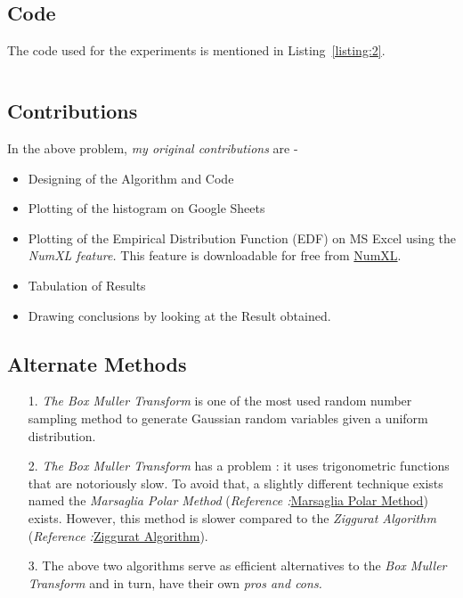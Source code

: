 \documentclass[titlepage, 11pt]{article}
\begin{document}
\newpage
\subsection{Code}
The code used for the experiments is mentioned in Listing~\ref{listing:2}. 

\inputminted[breaklines,
 mathescape,
 linenos,
 numbersep=5pt,
 frame=single,
 numbersep=5pt,
 xleftmargin=0pt]{c}{A2P2.c}
\label{listing:2}


\subsection{Contributions}
In the above problem, \textit{my original contributions} are - 
\begin{itemize}
    \item Designing of the Algorithm and Code
    \item Plotting of the histogram on Google Sheets 
    \item Plotting of the Empirical Distribution Function (EDF) on MS Excel using the \emph{NumXL feature.} This feature is downloadable for free from \href{https://numxl.com/}{NumXL}.
    \item Tabulation of Results 
    \item Drawing conclusions by looking at the Result obtained.
\end{itemize}

\subsection{Alternate Methods}
\begin{itemize}
    \item [1.]\textit{The Box Muller Transform} is one of the most used random number sampling method to generate Gaussian random variables given a uniform distribution. 
    \item [2.] \textit{The Box Muller Transform} has a problem : it uses trigonometric functions that are notoriously slow. To avoid that, a slightly different technique exists named the \textit{Marsaglia Polar Method} (\emph{Reference :}\href{https://en.wikipedia.org/wiki/Marsaglia_polar_method}{Marsaglia Polar Method}) exists. However, this method is slower compared to the \textit{Ziggurat Algorithm} (\emph{Reference :}\href{https://en.wikipedia.org/wiki/Ziggurat_algorithm}{Ziggurat Algorithm}). 
    \item [3.] The above two algorithms serve as efficient alternatives to the \textit{Box Muller Transform} and in turn, have their own \emph{pros and cons.}
\end{itemize}
% 
% 
\end{document}
